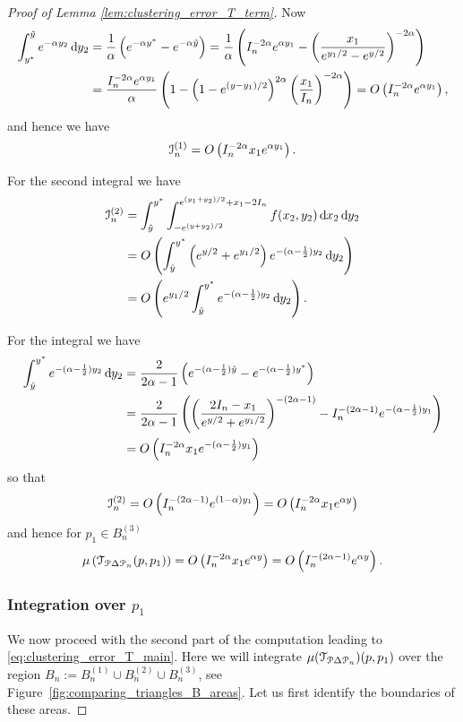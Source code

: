 \begin{proof}[Proof of Lemma \ref{lem:clustering_error_T_term}]
Now 
\begin{align*}
	\int_{y^\ast}^{\tilde{y}}  e^{-\alpha y_2} \operatorname{\mathrm{d}\hspace{-2pt}} y_2 
	&= \frac{1}{\alpha}\left(e^{-\alpha y^\ast} - e^{-\alpha \tilde{y}}\right) 
		= \frac{1}{\alpha}\left(I_n^{-2\alpha} e^{\alpha y_1} 
		- \left(\frac{x_1}{e^{y_1/2} - e^{y/2}}\right)^{-2\alpha}\right) \\
	&= \frac{I_n^{-2\alpha} e^{\alpha y_1}}{\alpha}\left(1 - \left(1 - e^{(y - y_1)/2}\right)^{2\alpha}
		\left(\frac{x_1}{I_n}\right)^{-2\alpha}\right) = O\left(I_n^{-2\alpha} e^{\alpha y_1}\right),
\end{align*}
and hence we have
\[
	\mathcal{I}_n^{(1)} = O\left(I_n^{-2\alpha} x_1 e^{\alpha y_1}\right).
\]

For the second integral we have
\begin{align*}
	\mathcal{I}_n^{(2)} &= \int_{\hat{y}}^{y^\ast} \int_{-e^{(y+y_2)/2}}^{e^{(y_1 + y_2)/2} + x_1 - 2I_n} 
		f(x_2,y_2)\operatorname{\mathrm{d}\hspace{-2pt}} x_2 \operatorname{\mathrm{d}\hspace{-2pt}} y_2\\
	&= O\left(\int_{\hat{y}}^{y^\ast} \left(e^{y/2} + e^{y_1/2}\right)e^{-(\alpha - \frac{1}{2})y_2} \operatorname{\mathrm{d}\hspace{-2pt}} y_2\right)\\
	&= O\left( e^{y_1/2} \int_{\hat{y}}^{y^\ast}e^{-(\alpha - \frac{1}{2})y_2} \operatorname{\mathrm{d}\hspace{-2pt}} y_2\right).
\end{align*}

For the integral we have
\begin{align*}
	\int_{\hat{y}}^{y^\ast}e^{-(\alpha - \frac{1}{2})y_2} \operatorname{\mathrm{d}\hspace{-2pt}} y_2
	&= \frac{2}{2\alpha - 1} \left(e^{-(\alpha - \frac{1}{2})\hat{y}} - e^{-(\alpha - \frac{1}{2})y^\ast}\right)\\
	&= \frac{2}{2\alpha - 1}\left(\left(\frac{2I_n - x_1}{e^{y/2} + e^{y_1/2}}\right)^{-(2\alpha - 1)} 
		- I_n^{-(2\alpha - 1)} e^{-(\alpha - \frac{1}{2})y_1}\right)\\
	&= O\left(I_n^{-2\alpha} x_1 e^{-(\alpha - \frac{1}{2})y_1}\right)
\end{align*}
so that
\[
	\mathcal{I}_n^{(2)} = O\left(I_n^{-(2\alpha - 1)} e^{(1-\alpha)y_1}\right) = O\left(I_n^{-2\alpha} x_1 e^{\alpha y}\right)
\]
and hence for $p_1 \in B_n^{(3)}$
\[
	\mu\left(\mathcal{T}_{{\mathcal P} \Delta {\mathcal P}_n}(p,p_1)\right) = O\left(I_n^{-2\alpha} x_1 e^{\alpha y}\right)
	= O\left(I_n^{-(2\alpha - 1)} e^{\alpha y}\right).
\]

\subsubsection*{Integration over $p_1$}



We now proceed with the second part of the computation leading to \eqref{eq:clustering_error_T_main}. Here we will integrate $\mu(\mathcal{T}_{{\mathcal P} \Delta {\mathcal P}_n})(p,p_1)$ over the region $B_n := B_n^{(1)} \cup B_n^{(2)} \cup B_n^{(3)}$, see Figure~\ref{fig:comparing_triangles_B_areas}. Let us first identify the boundaries of these areas. 


\end{proof}

